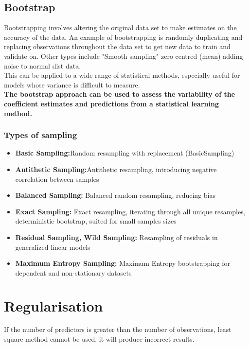 \documentclass[11pt]{scrartcl} %
\begin{document}
\subsection{Bootstrap}

Bootstrapping involves altering the original data set to make estimates on the accuracy of the data.
An example of bootstrapping is randomly duplicating and replacing observations throughout the data set
to get new data to train and validate on. Other types include "Smooth sampling" zero centred (mean) 
adding noise to normal dist data. \\

This can be applied to a wide range of statistical methods, especially useful for models whose variance
is difficult to measure.\\

\textbf{The bootstrap approach can be used  to assess the
variability of the coefficient estimates and predictions from a statistical learning method.}

\subsubsection{Types of sampling}

\begin{itemize}
	\item \textbf{Basic Sampling:}Random resampling with replacement (BasicSampling)
	\item \textbf{Antithetic Sampling:}Antithetic resampling, introducing negative correlation between samples
	\item \textbf{Balanced Sampling:} Balanced random resampling, reducing bias
	\item \textbf{Exact Sampling:} Exact resampling, iterating through all unique resamples, deterministic bootstrap, suited for small samples sizes
	\item \textbf{Residual Sampling, Wild Sampling:} Resampling of residuals in generalized linear models 
	\item \textbf{Maximum Entropy Sampling:} Maximum Entropy bootstrapping for dependent and non-stationary datasets 
\end{itemize}

\section{Regularisation}

If the number of predictors is greater than the number of observations, least square method cannot be 
used, it will produce incorrect results.
\end{document}
